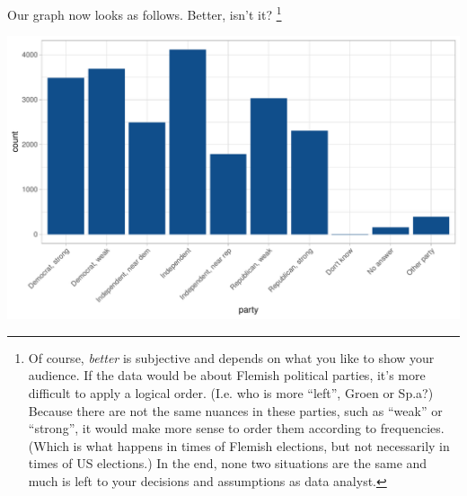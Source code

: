 \documentclass[]{tufte-book}
\newenvironment{Shaded}{}{}
\newcommand{\KeywordTok}[1]{\textcolor[rgb]{0.00,0.44,0.13}{\textbf{#1}}}
\newcommand{\DataTypeTok}[1]{\textcolor[rgb]{0.56,0.13,0.00}{#1}}
\newcommand{\DecValTok}[1]{\textcolor[rgb]{0.25,0.63,0.44}{#1}}
\newcommand{\StringTok}[1]{\textcolor[rgb]{0.25,0.44,0.63}{#1}}
\newcommand{\OperatorTok}[1]{\textcolor[rgb]{0.40,0.40,0.40}{#1}}
\newcommand{\NormalTok}[1]{#1}
\begin{document}
\begin{Shaded}
\end{Shaded}

Our graph now looks as follows. Better, isn't it? \footnote{Of course,
  \emph{better} is subjective and depends on what you like to show your
  audience. If the data would be about Flemish political parties, it's
  more difficult to apply a logical order. (I.e. who is more ``left'',
  Groen or Sp.a?) Because there are not the same nuances in these
  parties, such as ``weak'' or ``strong'', it would make more sense to
  order them according to frequencies. (Which is what happens in times
  of Flemish elections, but not necessarily in times of US elections.)
  In the end, none two situations are the same and much is left to your
  decisions and assumptions as data analyst.}

\begin{Shaded}
\end{Shaded}

\includegraphics{cleaning_tutorial_files/figure-latex/unnamed-chunk-29-1}
\end{document}
